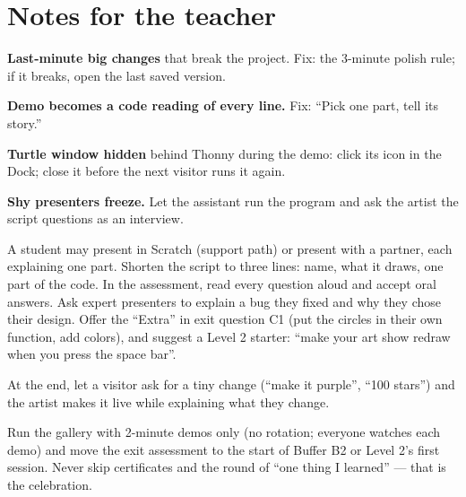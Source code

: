 \section{Notes for the teacher}
\begin{commonmistakes}
  \item \textbf{Last-minute big changes} that break the project. Fix: the 3-minute polish rule; if it breaks, open the last saved version.
  \item \textbf{Demo becomes a code reading of every line.} Fix: \enquote{Pick one part, tell its story.}
  \item \textbf{Turtle window hidden} behind Thonny during the demo: click its icon in the Dock; close it before the next visitor runs it again.
  \item \textbf{Shy presenters freeze.} Let the assistant run the program and ask the artist the script questions as an interview.
\end{commonmistakes}
\begin{differentiation}
\supportpath A student may present in Scratch (support path) or present with a partner, each explaining one part. Shorten the script to three lines: name, what it draws, one part of the code. In the assessment, read every question aloud and accept oral answers.
\extensionpath Ask expert presenters to explain a bug they fixed and why they chose their design. Offer the \enquote{Extra} in exit question C1 (put the circles in their own function, add colors), and suggest a Level 2 starter: \enquote{make your art show redraw when you press the space bar}.
\end{differentiation}
\begin{stretchchallenge}
At the end, let a visitor ask for a tiny change (\enquote{make it purple}, \enquote{100 stars}) and the artist makes it live while explaining what they change.
\end{stretchchallenge}
\begin{teachernote}
Run the gallery with 2-minute demos only (no rotation; everyone watches each demo) and move the exit assessment to the start of Buffer B2 or Level 2's first session. Never skip certificates and the round of \enquote{one thing I learned} --- that is the celebration.
\end{teachernote}
